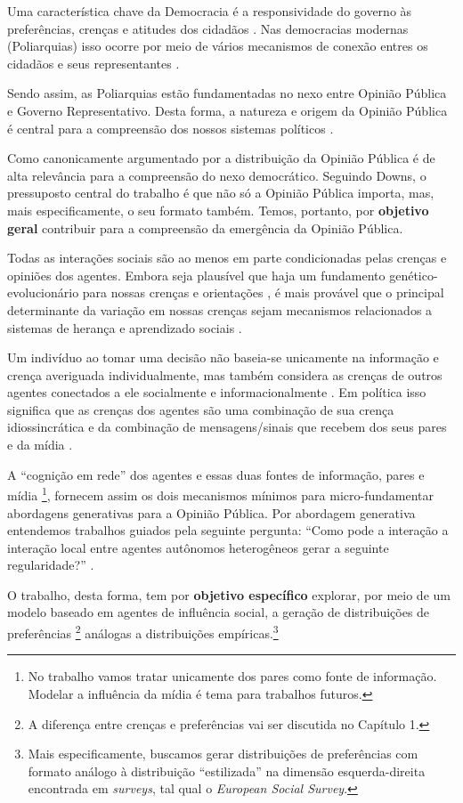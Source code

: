 Uma característica chave da Democracia é a responsividade do governo às
preferências, crenças e atitudes dos cidadãos
\cite{dahl1973polyarchy,bartels2003democracy}. Nas democracias modernas
(Poliarquias) isso ocorre por meio de vários mecanismos de conexão entres os
cidadãos e seus representantes \cite{dahl1989democracy,
  schumpeter2013capitalism}.

Sendo assim, as Poliarquias estão fundamentadas no nexo entre Opinião Pública e
Governo Representativo. Desta forma, a natureza e origem da Opinião Pública é
central para a compreensão dos nossos sistemas políticos
\cite{berelson1952democratic}.

Como canonicamente argumentado por  a distribuição
da Opinião Pública é de alta relevância para a compreensão do nexo democrático.
Seguindo Downs, o pressuposto central do trabalho é que não só a Opinião Pública
importa, mas, mais especificamente, o seu formato também. Temos, portanto, por
\textbf{objetivo geral} contribuir para a compreensão da emergência da Opinião
Pública.

Todas as interações sociais são ao menos em parte condicionadas pelas crenças e
opiniões dos agentes. Embora seja plausível que haja um fundamento
genético-evolucionário para nossas crenças e orientações
\cite{fowler2008biology, fowler2013defense}, é mais provável que o principal
determinante da variação em  nossas crenças sejam  mecanismos relacionados a 
sistemas de herança e aprendizado sociais \cite{jablonka2014evolution}.

Um indivíduo ao tomar uma decisão não baseia-se unicamente na informação e
crença averiguada individualmente, mas também considera as crenças de outros
agentes conectados a ele socialmente e informacionalmente
\cite{gintis2016individuality}. Em política isso significa que as crenças dos
agentes são uma combinação de sua crença idiossincrática e da combinação de
mensagens/sinais que recebem dos seus pares e da mídia
\cite{barabas2004deliberation,ryan2011social}.


A ``cognição em rede'' dos agentes e essas duas fontes de informação, pares e
mídia \footnote{No trabalho vamos tratar unicamente dos pares como fonte de
  informação. Modelar a influência da mídia é tema para trabalhos futuros.},
fornecem assim os dois mecanismos mínimos para micro-fundamentar abordagens
generativas para a Opinião Pública. Por abordagem generativa entendemos
trabalhos guiados pela seguinte pergunta: ``Como pode a interação a interação
local entre agentes autônomos heterogêneos  gerar a seguinte regularidade?''
.

O trabalho, desta forma, tem por \textbf{objetivo específico} explorar, por meio
de um modelo baseado em agentes de influência social, a geração de distribuições
de preferências \footnote{A diferença entre crenças e preferências vai ser
  discutida no Capítulo 1.} análogas a  distribuições empíricas.\footnote{Mais
especificamente, buscamos gerar distribuições de preferências
com formato análogo à distribuição ``estilizada'' na dimensão esquerda-direita
encontrada em \textit{surveys}, tal qual o \textit{European Social Survey}.}




